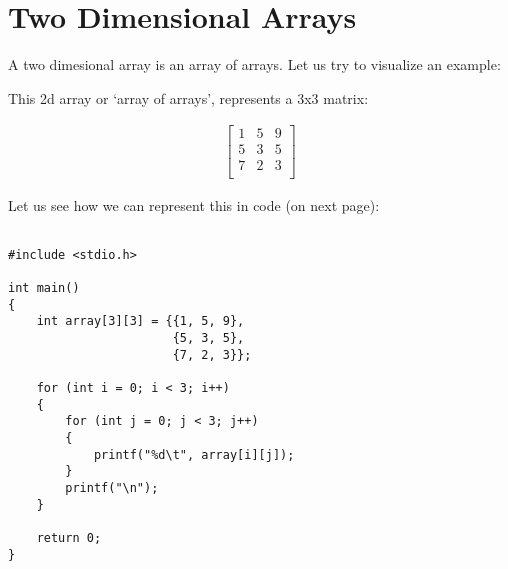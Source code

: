 \documentclass[12pt]{article}
\begin{document}
\newpage
{}
\section*{Two Dimensional Arrays}

A two dimesional array is an array of arrays. Let us try to visualize an example:

\begin{table}[H]
\end{table}

\noindent This 2d array or `array of arrays', represents a 3x3 matrix: 

\begin{align*}
    \begin{bmatrix}
        1 & 5 & 9 \\
        5 & 3 & 5 \\
        7 & 2 & 3 \\
    \end{bmatrix}
\end{align*}

\noindent Let us see how we can represent this in code (on next page):

\newpage

\begin{verbatim}

#include <stdio.h>

int main()
{
    int array[3][3] = {{1, 5, 9}, 
                       {5, 3, 5}, 
                       {7, 2, 3}};

    for (int i = 0; i < 3; i++)
    {
        for (int j = 0; j < 3; j++)
        {
            printf("%d\t", array[i][j]);
        }
        printf("\n");
    }

    return 0;
}

\end{verbatim}
\end{document}
